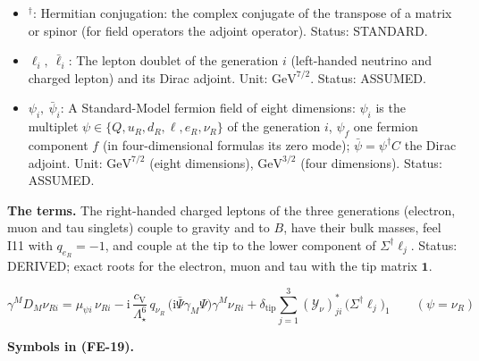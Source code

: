 \documentclass[
  10pt,
]{article}
\begin{document}
\begin{itemize}
  on the tip (\(\Sigma^\dagger\Sigma = \mathbf{1}\)) that replaces the
  Higgs doublet; its three modes are the longitudinal \(W^+\), \(W^-\)
  and \(Z\), and \(\Sigma = \mathbf{1}\) is the unitary gauge. Unit:
  dimensionless. Status: INVENTED.
\item
  \({}^\dagger\): Hermitian conjugation: the complex conjugate of the
  transpose of a matrix or spinor (for field operators the adjoint
  operator). Status: STANDARD.
\item
  \(\ell_i,\ \bar\ell_i\): The lepton doublet of the generation \(i\)
  (left-handed neutrino and charged lepton) and its Dirac adjoint. Unit:
  \(\mathrm{GeV}^{7/2}\). Status: ASSUMED.
\item
  \(\psi_i,\ \bar\psi_i\): A Standard-Model fermion field of eight
  dimensions: \(\psi_i\) is the multiplet
  \(\psi \in \{Q, u_R, d_R, \ell, e_R, \nu_R\}\) of the generation
  \(i\), \(\psi_f\) one fermion component \(f\) (in four-dimensional
  formulas its zero mode); \(\bar\psi = \psi^\dagger C\) the Dirac
  adjoint. Unit: \(\mathrm{GeV}^{7/2}\) (eight dimensions),
  \(\mathrm{GeV}^{3/2}\) (four dimensions). Status: ASSUMED.
\end{itemize}

\textbf{The terms.} The right-handed charged leptons of the three
generations (electron, muon and tau singlets) couple to gravity and to
\(B\), have their bulk masses, feel I11 with \(q_{e_R} = -1\), and
couple at the tip to the lower component of \(\Sigma^\dagger\ell_j\).
Status: DERIVED; exact roots for the electron, muon and tau with the tip
matrix \(\mathbf{1}\).

\[
\gamma^MD_M\nu_{Ri} = \mu_{\psi i}\,\nu_{Ri} - \mathrm{i}\,\frac{c_{\mathrm{V}}}{\Lambda_\star^6}\,q_{\nu_R}\,
 \big(\mathrm{i}\bar\Psi\gamma_M\Psi\big)\gamma^M\nu_{Ri}
 + \delta_{\mathrm{tip}}\sum_{j=1}^{3}(\mathcal{Y}_\nu)^*_{ji}\,\big(\Sigma^\dagger\ell_j\big)_1\qquad
 (\psi = \nu_R) \tag{FE-19}
\]

\textbf{Symbols in (FE-19).}
\end{document}
